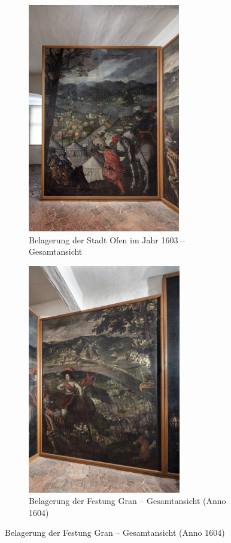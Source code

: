 \documentclass[
  a4paper,
]{book}
\begin{document}
\begin{figure}
\begin{figure}[H]    
  \includegraphics[height=10cm]{images/fmd10005844a.jpg}
  \caption{Belagerung der Stadt Ofen im Jahr 1603 – Gesamtansicht}
  \label{fig:{images/fmd10005844a.jpg}}
\end{figure}

\clearpage

\begin{figure}[H]    
  \includegraphics[height=10cm]{images/fmd10005845a.jpg}
  \caption{Belagerung der Festung Gran – Gesamtansicht (Anno 1604)}
  \label{fig:{images/fmd10005845a.jpg}}
\end{figure}

\clearpage


\end{figure}
\end{document}

